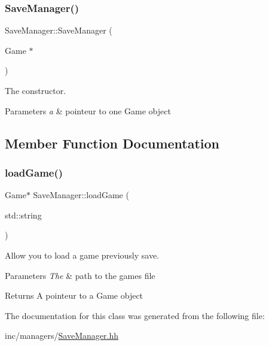 \subsubsection{\texorpdfstring{Save\+Manager()}{SaveManager()}}
{\footnotesize\ttfamily Save\+Manager\+::\+Save\+Manager (\begin{DoxyParamCaption}\item[{Game $\ast$}]{ }\end{DoxyParamCaption})}



The constructor. 


\begin{DoxyParams}{Parameters}
{\em a} & pointeur to one Game object \\
\hline
\end{DoxyParams}


\subsection{Member Function Documentation}
\mbox{\label{classSaveManager_aca377b93a5ebf5df19e313861d0ad5d4}} 
\subsubsection{\texorpdfstring{load\+Game()}{loadGame()}}
{\footnotesize\ttfamily Game$\ast$ Save\+Manager\+::load\+Game (\begin{DoxyParamCaption}\item[{std\+::string}]{ }\end{DoxyParamCaption})}



Allow you to load a game previously save. 


\begin{DoxyParams}{Parameters}
{\em The} & path to the game\textquotesingle{}s file \\
\hline
\end{DoxyParams}
\begin{DoxyReturn}{Returns}
A pointeur to a Game object 
\end{DoxyReturn}


The documentation for this class was generated from the following file\+:\begin{DoxyCompactItemize}
\item 
inc/managers/\hyperlink{SaveManager_8hh}{Save\+Manager.\+hh}\end{DoxyCompactItemize}
